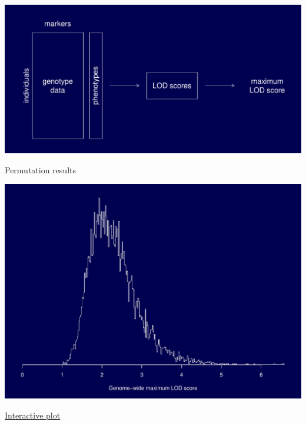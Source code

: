 \documentclass[12pt]{article}
\newcommand{\headsize}{\fontsize{35}{35} \selectfont}
\begin{document}
\vspace{2cm}

\centerline{\includegraphics{Figs/permtest.pdf}}

\newpage

\headsize \color{myyellow}
\hfill \begin{minipage}{5.75in}
\centering
Permutation results
\end{minipage}

\vfill

\centerline{\includegraphics{Figs/perm_hist.pdf}}



\newpage

\headsize \color{myyellow}
\hfill \begin{minipage}{5.75in}
\centering
\href{http://www.biostat.wisc.edu/~kbroman/D3/lod_random/}{Interactive plot}
\end{minipage}

\vspace{2cm}
\end{document}
